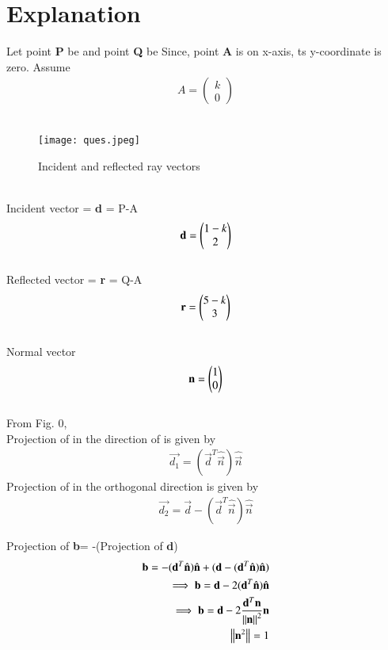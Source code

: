 \documentclass[journal,12pt,twocolumn]{IEEEtran}
\begin{document}
\section{Explanation}
Let point \textbf{P} be  and point \textbf{Q} be 
Since, point \textbf{A} is on x-axis, ts y-coordinate is zero.
Assume \begin{align}
    A=\begin{pmatrix} k \\ 0 \end{pmatrix}
\end{align} \\
\begin{figure}[h]
\centering
\texttt{[image: ques.jpeg]}
\caption{Incident and reflected ray vectors}
\label{fig:}
\end{figure}
\\
Incident vector = \textbf{d} = P-A
\begin{align}
    \textbf{d}=\begin{pmatrix}1-k \\ 2\end{pmatrix}
\end{align}
\\
Reflected vector = \textbf{r} = Q-A
\begin{align}
    \textbf{r}=\begin{pmatrix}5-k \\ 3\end{pmatrix}
\end{align}
\\
Normal vector
\begin{align}
    \textbf{n}=\begin{pmatrix}1\\0\end{pmatrix}
\end{align}
\\
From Fig. 0, \\
Projection of  in the direction of  is given by\\
\begin{align}
\Vec{d_{1}}=(\Vec{d}^{T}{\hat{\Vec{n}}})\hat{\Vec{n}}
\end{align}
Projection of  in the orthogonal direction is given by\\
\begin{align}
\Vec{d_{2}}=\vec{d}-(\Vec{d}^{T}{\hat{\Vec{n}}})\hat{\Vec{n}}
\end{align}

Projection of \textbf{b}= -(Projection of \textbf{d}) \\
\begin{align}
\Vec{b}=-(\Vec{d}^{T}{\hat{\Vec{n}}})\hat{\Vec{n}}+(\vec{d}-(\Vec{d}^{T}{\hat{\Vec{n}}})\hat{\Vec{n}})
\\
\implies \vec{b}=\vec{d}-2(\vec{d}^{T}\hat{\vec{n}})\hat{\vec{n}}\\
\implies \vec{b}=\vec{d}-2\dfrac{\vec{d}^{T}{\vec{n}}}{\norm{\vec{n}}^2}\vec{n}\\
\norm{\vec{n}^2}=1
\end{align}
\end{document}
